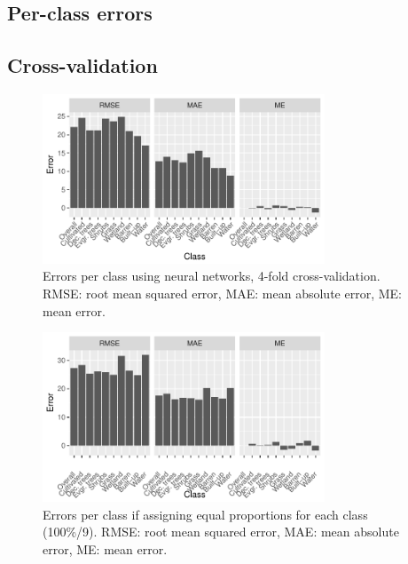\documentclass[a4paper,12pt]{scrbook}
\begin{document}
\begin{appendices}
 \chapter{Per-class errors}
 \section{Cross-validation}
 \begin{figure}[!h]
  \centering
  \includegraphics[width=0.75\textwidth]{thesis-figures/perclass-errors-nn}
  \caption{Errors per class using neural networks, 4-fold cross-validation. RMSE: root mean squared error, MAE: mean absolute error, ME: mean error.}
  \label{fig-perclass-errors-nn}
 \end{figure}
 \begin{figure}[!h]
  \centering
  \includegraphics[width=0.75\textwidth]{thesis-figures/perclass-errors-ctrl}
  \caption{Errors per class if assigning equal proportions for each class (100\%/9). RMSE: root mean squared error, MAE: mean absolute error, ME: mean error.}
  \label{fig-perclass-errors-ctrl}
 \end{figure}
 

\end{appendices}
\end{document}
